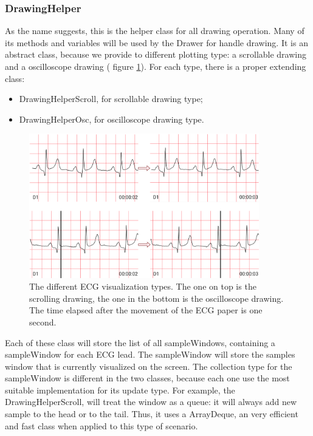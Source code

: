 \subsubsection{DrawingHelper}
As the name suggests, this is the helper class for all drawing operation. Many of its methods and variables will be used by the Drawer for handle drawing. It is an abstract class, because we provide to different plotting type: a scrollable drawing and a oscilloscope drawing ( figure \ref*{fig9.9}). For each type, there is a proper extending  class:
\begin{itemize}
	\item DrawingHelperScroll, for scrollable drawing type;
	\item DrawingHelperOsc, for oscilloscope drawing type.
\end{itemize}
\begin{figure}[ht!]
	\centering
	\includegraphics[width=100mm]{figures/ch9/9.png}
	\caption{The different ECG visualization types. The one on top is the scrolling drawing, the one in the bottom is the oscilloscope drawing. The time elapsed after the movement of the ECG paper is one second.}
	\label{fig9.9}
\end{figure}
Each of these class will store the list of all sampleWindows, containing a sampleWindow for each ECG lead. The sampleWindow will store the samples window that is currently visualized on the screen. The collection type for the sampleWindow is different in the two classes, because each one use the most suitable implementation for its update type. For example, the DrawingHelperScroll, will treat the window as a queue: it will always add new sample to the head or to the tail. Thus, it uses a ArrayDeque, an very efficient and fast class when applied to this type of scenario.\\
